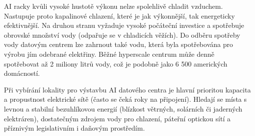 AI racky kvůli vysoké hustotě výkonu nelze spolehlivě chladit vzduchem. Nastupuje proto kapalinové chlazení, které je jak výkonnější, tak energeticky efektivnější. Na druhou stranu vyžaduje vysoké počáteční investice a spotřebuje obrovské množství vody (odpařuje se v chladicích věžích). Do odběru spotřeby vody datovým centrem lze zahrnout také vodu, která byla spotřebována pro výrobu jím odebrané elektřiny. Běžné hyperscale centrum může denně spotřebovat až 2 miliony litrů vody, což je podobně jako 6 500 amerických domácností.~\cite{international_energy_agency_iea_energy_2025,shah_four_2026,jegham_how_2025,cruzes_data_2025}

Při vybírání lokality pro výstavbu AI datového centra je hlavní prioritou kapacita a propustnost elektrické sítě (často se čeká roky na připojení). Hledají se místa s levnou a stabilní bezuhlíkovou energií (blízkost větrných, solárních či jaderných elektráren), dostatečným zdrojem vody pro chlazení, páteřní optickou sítí a příznivým legislativním i daňovým prostředím.~\cite{lin_exploding_2024, chen_electricity_2025, pilz_compute_2023, geng_data_2014}
